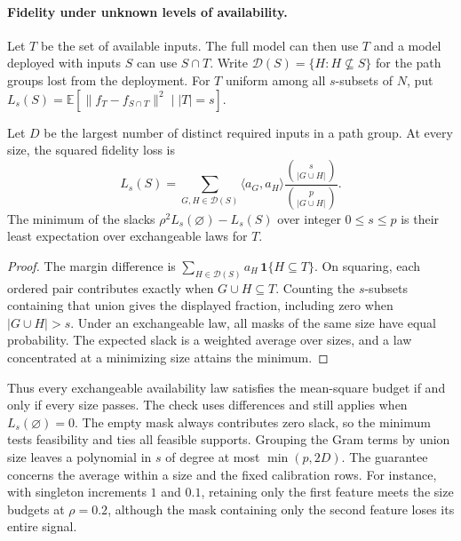 \paragraph{Fidelity under unknown levels of availability.}
Let $T$ be the set of available inputs. The full model can then use $T$ and
a model deployed with inputs $S$ can use $S\cap T$. Write
$\mathcal D(S)=\{H:H\not\subseteq S\}$ for the path groups lost from the
deployment. For $T$ uniform among all $s$-subsets of $N$, put
$L_s(S)=\mathbb E[\|f_T-f_{S\cap T}\|^2\mid |T|=s]$.

\begin{proposition}
Let $D$ be the largest number of distinct required inputs in a path group.
At every size, the squared fidelity loss is
\[
 L_s(S)=\sum_{G,H\in\mathcal D(S)}
  \langle a_G,a_H\rangle
  \frac{\binom{s}{|G\cup H|}}{\binom{p}{|G\cup H|}} .
\]
The minimum of the slacks $\rho^2 L_s(\varnothing)-L_s(S)$ over integer
$0\le s\le p$ is their least expectation over exchangeable laws for $T$.
\end{proposition}
\begin{proof}
The margin difference is
$\sum_{H\in\mathcal D(S)} a_H\,\mathbf 1\{H\subseteq T\}$.
On squaring, each ordered pair contributes exactly when $G\cup H\subseteq T$.
Counting the $s$-subsets containing that union gives the displayed fraction,
including zero when $|G\cup H|>s$. Under an exchangeable law, all masks of
the same size have equal probability. The expected slack is a weighted
average over sizes, and a law concentrated at a minimizing size attains the minimum.
\end{proof}

Thus every exchangeable availability law satisfies the mean-square budget if
and only if every size passes. The check uses differences and still applies
when $L_s(\varnothing)=0$. The empty mask always contributes zero slack, so
the minimum tests feasibility and ties all feasible supports. Grouping the Gram terms by union size leaves a
polynomial in $s$ of degree at most $\min(p,2D)$. The guarantee concerns
the average within a size and the fixed calibration rows. For instance, with
singleton increments $1$ and $0.1$, retaining only the first feature meets
the size budgets at $\rho=0.2$, although the mask containing only the second
feature loses its entire signal.
